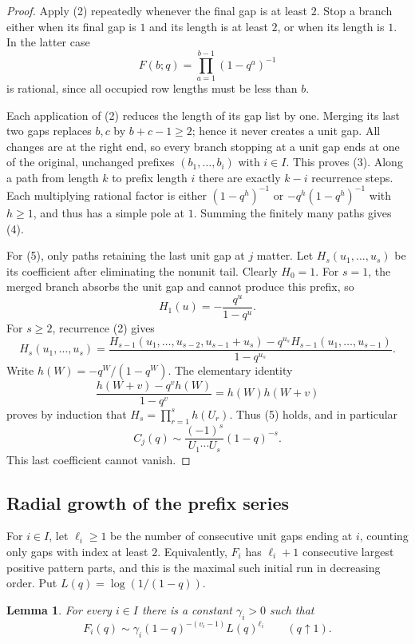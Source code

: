 \documentclass[11pt,a4paper]{article}
\numberwithin{equation}{section}
\newtheorem{lemma}[theorem]{Lemma}
\theoremstyle{definition}
\theoremstyle{remark}
\begin{document}
\begin{proof}
Apply (2) repeatedly whenever the final gap is at least $2$.  Stop a
branch either when its final gap is $1$ and its length is at least
$2$, or when its length is $1$.  In the latter case
\[
 F(b;q)=\prod_{a=1}^{b-1}(1-q^a)^{-1}                         \tag{6}
\]
is rational, since all occupied row lengths must be less than $b$.

Each application of (2) reduces the length of its gap list by one.
Merging its last two gaps replaces $b,c$ by $b+c-1\ge2$; hence it
never creates a unit gap.  All changes are at the right end, so every
branch stopping at a unit gap ends at one of the original, unchanged
prefixes $(b_1,\ldots,b_i)$ with $i\in I$.  This proves (3).
Along a path from length $k$ to prefix length $i$ there are exactly
$k-i$ recurrence steps.  Each multiplying rational factor is either
$(1-q^h)^{-1}$ or $-q^h(1-q^h)^{-1}$ with $h\ge1$, and thus has a
simple pole at $1$.  Summing the finitely many paths gives (4).

For (5), only paths retaining the last unit gap at $j$ matter.
Let $H_s(u_1,\ldots,u_s)$ be its coefficient after eliminating the
nonunit tail.  Clearly $H_0=1$.  For $s=1$, the merged branch absorbs
the unit gap and cannot produce this prefix, so
\[
 H_1(u)=-\frac{q^u}{1-q^u}.
\]
For $s\ge2$, recurrence (2) gives
\[
 H_s(u_1,\ldots,u_s)=
 \frac{H_{s-1}(u_1,\ldots,u_{s-2},u_{s-1}+u_s)
      -q^{u_s}H_{s-1}(u_1,\ldots,u_{s-1})}
      {1-q^{u_s}}.                                      \tag{7}
\]
Write $h(W)=-q^W/(1-q^W)$.  The elementary identity
\[
 \frac{h(W+v)-q^v h(W)}{1-q^v}=h(W)h(W+v)             \tag{8}
\]
proves by induction that $H_s=\prod_{r=1}^s h(U_r)$.
Thus (5) holds, and in particular
\[
 C_j(q)\sim
   \frac{(-1)^s}{U_1\cdots U_s}(1-q)^{-s}.            \tag{9}
\]
This last coefficient cannot vanish.
\end{proof}

\subsection{Radial growth of the prefix series}
For $i\in I$, let $\ell_i\ge1$ be the number of consecutive unit gaps
ending at $i$, counting only gaps with index at least $2$.
Equivalently, $F_i$ has $\ell_i+1$ consecutive largest positive
pattern parts, and this is the maximal such initial run in decreasing
order.  Put $L(q)=\log(1/(1-q))$.

\begin{lemma}\label{add47taisho:r47:prefix}
For every $i\in I$ there is a constant $\gamma_i>0$ such that
\[
 F_i(q)\sim\gamma_i(1-q)^{-(v_i-1)}L(q)^{\ell_i}
 \qquad(q\uparrow1).                               \tag{10}
\]
\end{lemma}
\end{document}
